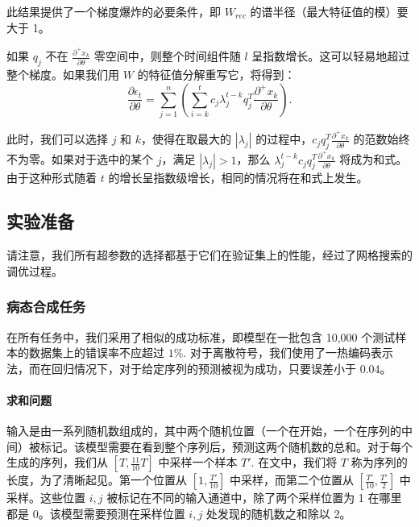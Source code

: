 此结果提供了一个梯度爆炸的必要条件，即 \(W_{rec}\) 的谱半径（最大特征值的模）要大于 1。

如果 \(q_j\) 不在 \(\frac{\partial^+x_k}{\partial\theta}\) 零空间中，则整个时间组件随 \(l\) 呈指数增长。这可以轻易地超过整个梯度。如果我们用 \(W\) 的特征值分解重写它，将得到：
\begin{equation}\label{14}
  \frac{\partial \epsilon_t}{\partial\theta}=\sum_{j=1}^n(\sum_{i=k}^tc_j\lambda_j^{t-k}q_j^T\frac{\partial^+x_k}{\partial\theta}).
\end{equation}

此时，我们可以选择 \(j\) 和 \(k\)，使得在取最大的 \(|\lambda_j|\) 的过程中，\(c_jq_j^T\frac{\partial^+x_k}{\partial\theta}\) 的范数始终不为零。如果对于选中的某个 \(j\)，满足 \(|\lambda_j| > 1\)，那么 \(\lambda_j^{t-k}c_jq_j^T\frac{\partial^+x_k}{\partial\theta}\) 将成为和式。由于这种形式随着 \(t\) 的增长呈指数级增长，相同的情况将在和式上发生。

\subsection{实验准备}\label{ux5b9eux9a8cux51c6ux5907}

请注意，我们所有超参数的选择都基于它们在验证集上的性能，经过了网格搜索的调优过程。

\subsubsection{病态合成任务}\label{ux75c5ux6001ux5408ux6210ux4efbux52a1}

在所有任务中，我们采用了相似的成功标准，即模型在一批包含 10,000
个测试样本的数据集上的错误率不应超过 \(1\%\). 对于离散符号，我们使用了一热编码表示法，而在回归情况下，对于给定序列的预测被视为成功，只要误差小于 0.04。

\paragraph{求和问题}\label{ux6c42ux548cux95eeux9898}

输入是由一系列随机数组成的，其中两个随机位置（一个在开始，一个在序列的中间）被标记。该模型需要在看到整个序列后，预测这两个随机数的总和。对于每个生成的序列，我们从 \([T, \frac{11}{10}T]\) 中采样一个样本 \(T'\). 在文中，我们将 \(T\) 称为序列的长度，为了清晰起见。第一个位置从 \([1, \frac{T'}{10}]\) 中采样，而第二个位置从 \([\frac{T'}{10}, \frac{T'}{2}]\) 中采样。这些位置 \(i,j\) 被标记在不同的输入通道中，除了两个采样位置为 1 在哪里都是 0。该模型需要预测在采样位置 \(i,j\) 处发现的随机数之和除以 2。

